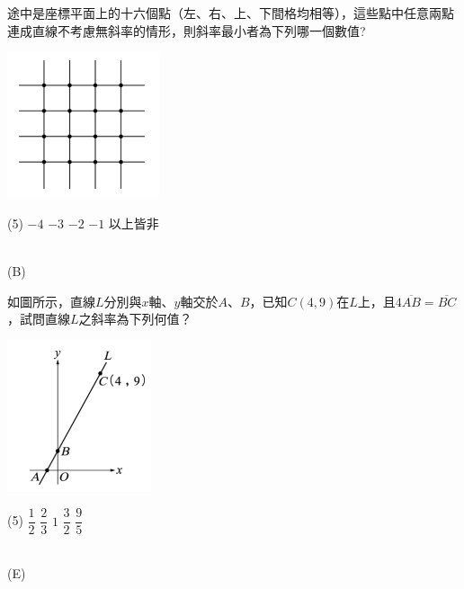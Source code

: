 \documentclass
[answers]
{exam}
\theoremstyle{definition}
\begin{document}
\begin{questions}
\question

\begin{minipage}[t]{0.7\linewidth}
	途中是座標平面上的十六個點（左、右、上、下間格均相等），這些點中任意兩點連成直線不考慮無斜率的情形，則斜率最小者為下列哪一個數值?
\end{minipage}
\hfill
\begin{minipage}[t]{0.3\linewidth}
	\vspace*{-0.3cm}
	\includegraphics[scale=1]{./chapter_3/figure/6.png}
	\raggedleft %
\end{minipage}

\begin{tasks}(5)
	\task $-4$
	\task $-3$
	\task $-2$
	\task $-1$
	\task 以上皆非
\end{tasks}
\begin{solution}~\\
	(B)
\end{solution}

\question

\begin{minipage}[t]{0.7\linewidth}
	如圖所示，直線$L$分別與$x$軸、$y$軸交於$A$、$B$，已知$C\left( 4,9 \right)$在$L$上，且$4\overline{AB}=\overline{BC}$，試問直線$L$之斜率為下列何值？
\end{minipage}
\hfill
\begin{minipage}[t]{0.3\linewidth}
	\vspace*{-0.3cm}
	\includegraphics[scale=1]{./chapter_3/figure/7.png}
	\raggedleft %
\end{minipage}


\begin{tasks}(5)
	\task $\dfrac{1}{2}$
	\task $\dfrac{2}{3}$
	\task $1$
	\task $\dfrac{3}{2}$
	\task $\dfrac{9}{5}$
\end{tasks}
\begin{solution}~\\
	(E)
\end{solution}


\end{questions}
\end{document}
